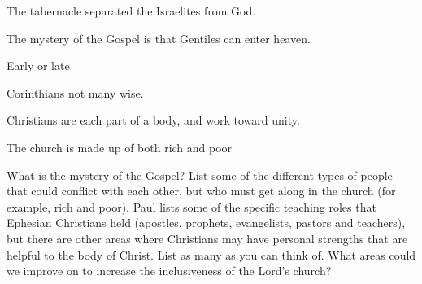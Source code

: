 \begin{discussion}


 The tabernacle separated the Israelites from God.

 The mystery of the Gospel is that Gentiles can enter heaven.


 Early or late

Corinthians not many wise.


 Christians are each part of a body, and work toward unity.

 The church is made up of both rich and poor

\end{discussion}

\begin{questions}
\q What is the mystery of the Gospel?
\q List some of the different types of people that could conflict with each other, but who must get along in the church (for example, rich and poor).
\q Paul lists some of the specific teaching roles that Ephesian Christians held (apostles, prophets, evangelists, pastors and teachers), but there are other areas where Christians may have personal strengths that are helpful to the body of Christ.  List as many as you can think of.
\q What areas could we improve on to increase the inclusiveness of the Lord's church?
\end{questions}